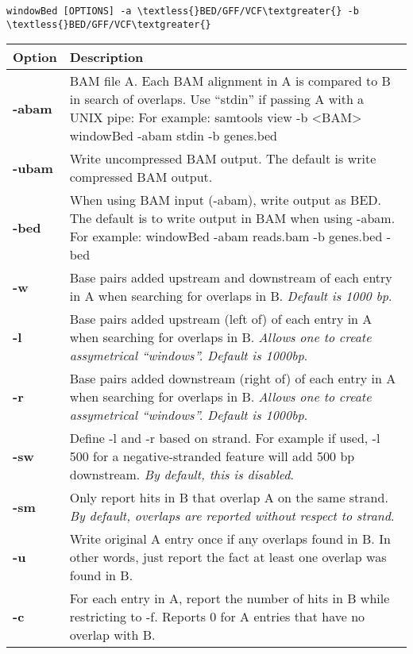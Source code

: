 \documentclass[letterpaper,10pt,english]{sphinxmanual}
\begin{document}
\begin{Verbatim}[commandchars=\\\{\}]
windowBed [OPTIONS] -a \textless{}BED/GFF/VCF\textgreater{} -b \textless{}BED/GFF/VCF\textgreater{}
\end{Verbatim}

\begin{tabulary}{\linewidth}{|L|L|}
\hline
\textbf{
Option
} & \textbf{
Description
}\\\hline

\textbf{-abam}
 & 
BAM file A. Each BAM alignment in A is compared to B in search of overlaps. Use ``stdin'' if passing A with a UNIX pipe: For example:  samtools view -b \textless{}BAM\textgreater{} \textbar{} windowBed -abam stdin -b genes.bed
\\\hline

\textbf{-ubam}
 & 
Write uncompressed BAM output. The default is write compressed BAM output.
\\\hline

\textbf{-bed}
 & 
When using BAM input (-abam), write output as BED. The default is to write output in BAM when using -abam. For example:  windowBed -abam reads.bam -b genes.bed -bed
\\\hline

\textbf{-w}
 & 
Base pairs added upstream and downstream of each entry in A when searching for overlaps in B. \emph{Default is 1000 bp}.
\\\hline

\textbf{-l}
 & 
Base pairs added upstream (left of) of each entry in A when searching for overlaps in B. \emph{Allows one to create assymetrical ``windows''. Default is 1000bp}.
\\\hline

\textbf{-r}
 & 
Base pairs added downstream (right of) of each entry in A when searching for overlaps in B. \emph{Allows one to create assymetrical ``windows''. Default is 1000bp}.
\\\hline

\textbf{-sw}
 & 
Define -l and -r based on strand. For example if used, -l 500 for a negative-stranded feature will add 500 bp downstream. \emph{By default, this is disabled}.
\\\hline

\textbf{-sm}
 & 
Only report hits in B that overlap A on the same strand. \emph{By default, overlaps are reported without respect to strand}.
\\\hline

\textbf{-u}
 & 
Write original A entry once if any overlaps found in B. In other words, just report the fact at least one overlap was found in B.
\\\hline

\textbf{-c}
 & 
For each entry in A, report the number of hits in B while restricting to -f. Reports 0 for A entries that have no overlap with B.
\\\hline
\end{tabulary}
\end{document}
